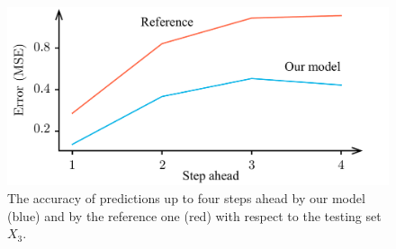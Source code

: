 \begin{figure}[t]
  \centering
  \includegraphics[width=1.0\columnwidth]{include/assets/figures/testing.pdf}
  \caption{
    The accuracy of predictions up to four steps ahead by our model (blue) and
    by the reference one (red) with respect to the testing set $X_3$.
  }
  \vspace{-1.5em}
\end{figure}

